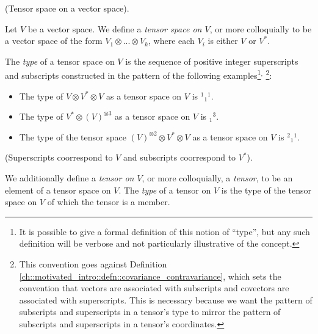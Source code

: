 \begin{defn}
\label{ch::motivated_intro::defn::tensor_space_on_a_vector_space}
    (Tensor space on a vector space).
    
    Let $V$ be a vector space. We define a \textit{tensor space on $V$}, or more colloquially to be a vector space of the form $V_1 \otimes ... \otimes V_k$, where each $V_i$ is either $V$ or $V^*$.
    
    The \textit{type} of a tensor space on $V$ is the sequence of positive integer superscripts and subscripts constructed in the pattern of the following examples\footnote{It is possible to give a formal definition of this notion of ``type'', but any such definition will be verbose and not particularly illustrative of the concept.}$^{,}$ \footnote{This convention goes against Definition \ref{ch::motivated_intro::defn::covariance_contravariance}, which sets the convention that vectors are associated with subscripts and covectors are associated with superscripts. This is necessary because we want the pattern of subscripts and superscripts in a tensor's type to mirror the pattern of subscripts and superscripts in a tensor's coordinates.}:
    
    \begin{itemize}
        \item The type of $V \otimes V^* \otimes V$ as a tensor space on $V$ is $^1{}_1{}^1$.
        \item The type of $V^* \otimes (V)^{\otimes 3}$ as a tensor space on $V$ is $_1{}^3$.
        \item The type of the tensor space $(V)^{\otimes 2} \otimes V^* \otimes V$ as a tensor space on $V$ is $^2{}_1{}^1$.
    \end{itemize}

    (Superscripts coorrespond to $V$ and subscripts coorrespond to $V^*$).
    
    We additionally define a \textit{tensor on $V$}, or more colloquially, a \textit{tensor}, to be an element of a tensor space on $V$. The \textit{type} of a tensor on $V$ is the type of the tensor space on $V$ of which the tensor is a member.
\end{defn}

